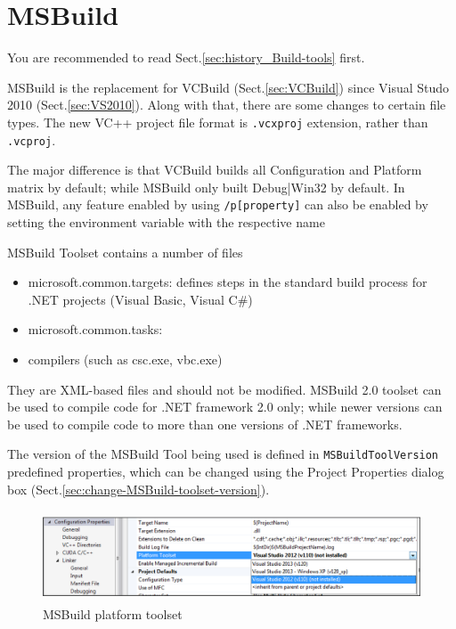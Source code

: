 \section{MSBuild}
\label{sec:MSBuild}

You are recommended to read Sect.\ref{sec:history_Build-tools} first.

MSBuild is the replacement for VCBuild (Sect.\ref{sec:VCBuild}) since Visual
Studo 2010 (Sect.\ref{sec:VS2010}). Along with that, there are some changes
to certain file types. The new VC++ project file format is \verb!.vcxproj!
extension, rather than \verb!.vcproj!.

\begin{mdframed}
The major difference is that VCBuild builds all Configuration and Platform
matrix by default; while MSBuild only built Debug|Win32 by default.
In MSBuild, any feature enabled by using \verb!/p[property]! can also be enabled
by setting the environment variable with the respective name
\end{mdframed}


MSBuild Toolset contains a number of files
\begin{itemize}
  \item microsoft.common.targets: defines steps in the standard build process
  for .NET projects (Visual Basic, Visual C\#)
  \item microsoft.common.tasks: 
  \item compilers (such as csc.exe, vbc.exe)
\end{itemize}
They are XML-based files and should not be modified. MSBuild 2.0 toolset can be
used to compile code for .NET framework 2.0 only; while newer versions can be
used to compile code to more than one versions of .NET frameworks.

The version of the MSBuild Tool being used is defined in
\verb!MSBuildToolVersion! predefined properties, which can be changed using the
Project Properties dialog box (Sect.\ref{sec:change-MSBuild-toolset-version}).

\begin{figure}[hbt]
  \centerline{\includegraphics[height=2.7cm,
    angle=0]{./images/MSBuild_platform-toolset.eps}}
\caption{MSBuild platform toolset}
\label{fig:MSBuild_platform-toolset}
\end{figure}


